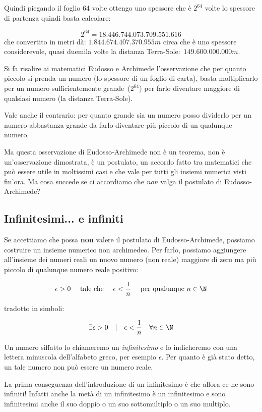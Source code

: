 Quindi piegando il foglio 64 volte ottengo uno spessore che è $2^{64}$ volte 
lo spessore di partenza quindi basta calcolare:

\[2^{64} = 18.446.744.073.709.551.616\]
che convertito in metri dà: $1.844.674.407.370.955m$ circa che è uno 
spessore considerevole, quasi duemila volte la distanza 
Terra-Sole:~$149.600.000.000m$.

Si fa risalire ai matematici Eudosso e Archimede l'osservazione che per 
quanto 
piccolo si prenda un numero (lo spessore di un foglio di carta), basta 
moltiplicarlo per un numero sufficientemente grande~($2^{64}$) per farlo 
diventare maggiore di qualsiasi numero (la distanza Terra-Sole).

Vale anche il contrario: per quanto grande sia un numero posso dividerlo per 
un numero abbastanza grande da farlo diventare più piccolo di un qualunque 
numero.

Ma questa osservazione di Eudosso-Archimede non è un teorema, non è 
un'osservazione dimostrata, è un postulato, un accordo fatto tra matematici 
che può essere utile in moltissimi casi e che vale per tutti gli insiemi 
numerici visti fin'ora. 
Ma cosa succede se ci accordiamo che \emph{non} valga il postulato di 
Eudosso-Archimede?

\subsection{Infinitesimi... e infiniti}
\label{subsec:insnum_nonarchimedei}

Se accettiamo che possa \textbf{non} valere il postulato di 
Eudosso-Archimede, possiamo costruire un insieme numerico non archimedeo. 
Per farlo, possiamo aggiungere all'insieme dei numeri reali un nuovo numero 
(non reale) maggiore di zero ma più piccolo di qualunque numero reale 
positivo:

\[\epsilon > 0 \quad \text{ tale che } \quad 
\epsilon < \frac{1}{n} \quad \text{ per qualunque } n \in \N\]

tradotto in simboli:

\[\exists \epsilon > 0 \quad | \quad \epsilon < \frac{1}{n} \quad \forall n 
\in \N\]

Un numero siffatto lo chiameremo un \emph{infinitesimo} e lo indicheremo 
con una lettera minuscola dell'alfabeto greco, per esempio $\epsilon$.
Per quanto è già stato detto, un tale numero non può essere un numero
reale. 

La prima conseguenza dell'introduzione di un infinitesimo è che allora ce 
ne sono infiniti! 
Infatti anche la metà di un infinitesimo è un infinitesimo e 
sono infinitesimi anche il suo doppio o un suo sottomultiplo o un suo 
multiplo.

